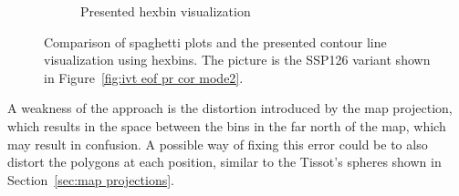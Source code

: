 \begin{figure}[!htb]
\begin{subfigure}[b]{0.51\textwidth}
    \caption{Presented hexbin visualization}
    \label{fig:comparsion member vis hexbin}
  \end{subfigure}
  \caption{Comparison of spaghetti plots and the presented contour line visualization using hexbins. The picture is the SSP126 variant shown in Figure~\ref{fig:ivt eof pr cor mode2}.}
    \label{fig:comparsion member vis}
\end{figure}

A weakness of the approach is the distortion introduced by the map projection, which results in the space between the bins in the far north of the map, which may result in confusion. 
A possible way of fixing this error could be to also distort the polygons at each position, similar to the Tissot's spheres shown in Section~\ref{sec:map projections}. 

%

